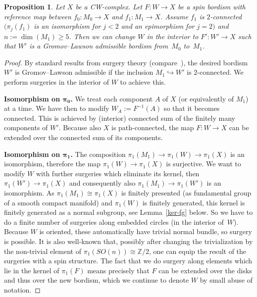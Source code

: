\documentclass[10pt,a4paper]{amsart}
\numberwithin{equation}{section}
\newtheorem{Proposition}[Theorem]{Proposition}
 { \theoremstyle{definition}
\newtheorem{Example}[Theorem]{Example}
\newtheorem{Remark}[Theorem]{Remark} }
\newcommand{\integers}{\mathbb{Z}}
\newcommand{\into}{\hookrightarrow}
\begin{document}
\begin{Proposition}\label{prop:change_bord} Let $X$ be a CW-complex.
 Let $F\colon W\to X$ be a spin bordism with reference map between $f_0\colon
 M_0\to X$ and $f_1\colon M_1\to X$. Assume $f_1$ is
 $2$-connected $(\pi_j(f_1)$ is an isomorphism for $j<2$ and an epimorphism
 for $j=2)$ and
 $n:=\dim(M_1)\ge 5$. Then we
 can change $W$ in the interior to $F'\colon W'\to X$ such that $W'$ is a
 Gromov--Lawson admissible bordism from~$M_0$ to~$M_1$.
\end{Proposition}
\begin{proof}
 By standard results from surgery theory (compare~\cite{Wall}), the desired bordism $W'$ is
 Gromov--Lawson admissible if the inclusion $M_1\into W'$ is $2$-connected. We
 perform surgeries in the interior of $W$ to achieve this.

 \textbf{Isomorphism on $\boldsymbol{\pi_0}$.} We treat each component $A$ of $X$ (or
 equivalently of $M_1$) at a time. We have then to modify $W_A:=F^{-1}(A)$
 so that it becomes connected. This is achieved by (interior) connected sum
 of the finitely many components of $W'$. Because also $X$ is
 path-connected, the map $F\colon W\to X$ can be extended over the
 connected sum of its components.

 \textbf{Isomorphism on $\boldsymbol{\pi_1}$.} The composition $\pi_1(M_1)\to
 \pi_1(W)\to \pi_1(X)$ is an isomorphism, therefore the map $\pi_1(W)\to
 \pi_1(X)$ is surjective. We want to modify $W$ with further
 surgeries which eliminate
 its kernel, then $\pi_1(W')\to\pi_1(X)$ and consequently also $\pi_1(M_1)\to
 \pi_1(W')$ is an isomorphism. As $\pi_1(M_1)\cong \pi_1(X)$ is
 finitely presented (as fundamental group of a smooth compact manifold)
 and $\pi_1(W)$ is finitely generated, this
 kernel is finitely generated as a normal subgroup, see Lemma~\ref{ker-fg} below. So we have to do a finite
 number of surgeries along embedded circles (in the interior of~$W$). Because
 $W$ is oriented, these automatically have trivial normal bundle, so surgery
 is possible. It is also well-known that, possibly after changing the trivialization by the non-trivial element of
 $\pi_1(SO(n))\cong \integers/2$, one can equip the result of the surgeries
 with a spin structure. The fact
 that we do surgery along elements which lie in the kernel of
 $\pi_1(F)$ means precisely that $F$ can be extended over the disks and thus
 over the new bordism, which we continue to denote $W$ by small abuse of
 notation.


\end{proof}
\end{document}

